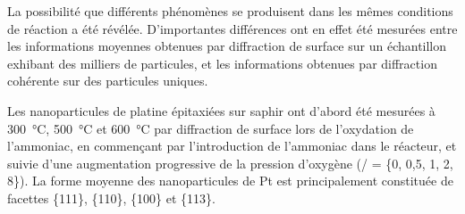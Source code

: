 La possibilité que différents phénomènes se produisent dans les mêmes conditions de réaction a été révélée.
D'importantes différences ont en effet été mesurées entre les informations moyennes obtenues par diffraction de surface sur un échantillon exhibant des milliers de particules, et les informations obtenues par diffraction cohérente sur des particules uniques.

Les nanoparticules de platine épitaxiées sur saphir ont d'abord été mesurées à \qty{300}{\degreeCelsius}, \qty{500}{\degreeCelsius} et \qty{600}{\degreeCelsius} par diffraction de surface lors de l'oxydation de l'ammoniac, en commençant par l'introduction de l'ammoniac dans le réacteur, et suivie d'une augmentation progressive de la pression d'oxygène (/ = \{0, 0,5, 1, 2, 8\}).
La forme moyenne des nanoparticules de Pt est principalement constituée de facettes \{111\}, \{110\}, \{100\} et \{113\}.

